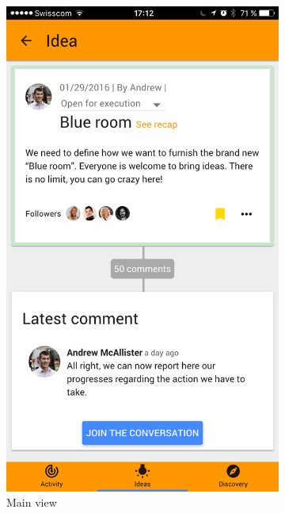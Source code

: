 \documentclass[a4paper,12pt,twoside]{article}
\begin{document}
\begin{figure}[!htb]
    \begin{subfigure}[t]{.32\textwidth}
        \includegraphics[width=\textwidth]{images/idea.png}
        \caption{Main view}
        \label{fig.idea.main}
    \end{subfigure}
    \hfill
    \begin{subfigure}[t]{.32\textwidth}

\end{subfigure}
\end{figure}
\end{document}
